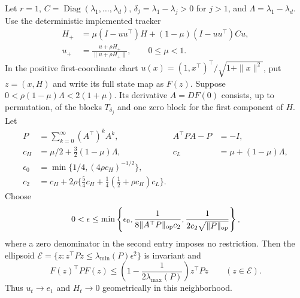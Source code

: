 \begin{theorem}
\label{thm:rankone-QR-Lyapunov}
Let $r=1$, $C=\operatorname{Diag}(\lambda_1,\ldots,\lambda_d)$,
$\delta_j=\lambda_1-\lambda_j>0$ for $j>1$, and
$\Lambda=\lambda_1-\lambda_d$. Use the deterministic implemented tracker
\begin{align}
 H_+&=\mu(I-uu^\top)H+(1-\mu)(I-uu^\top)Cu,\\
 u_+&=\frac{u+\rho H_+}{\|u+\rho H_+\|},\qquad0\le\mu<1.
 \label{eq:rankone-actual-map}
\end{align}
In the positive first-coordinate chart
$u(x)=(1,x^\top)^\top/\sqrt{1+\|x\|^2}$, put $z=(x,H)$ and write its
full state map as $F(z)$. Suppose
$0<\rho(1-\mu)\Lambda<2(1+\mu)$.
Its derivative $A=DF(0)$ consists, up to permutation, of the blocks
$T_{\delta_j}$ and one zero block for the first component of $H$.
Let
\begin{align}
 P&=\sum_{k=0}^{\infty}(A^\top)^kA^k,&A^\top PA-P&=-I,\\
 c_H&=\mu/2+\tfrac32(1-\mu)\Lambda,&
 c_L&=\mu+(1-\mu)\Lambda,\\
 \epsilon_0&=\min\{1/4,(4\rho c_H)^{-1/2}\},\\
 c_2&=c_H+2\rho\{\tfrac54c_H+
                   \tfrac14(\tfrac12+\rho c_H)c_L\}.
\end{align}
Choose
\begin{equation}
 0<\epsilon\le\min\left\{\epsilon_0,
 \frac1{8\|A^\top P\|_{\rm op}c_2},
 \frac1{2c_2\sqrt{\|P\|_{\rm op}}}\right\},
 \label{eq:explicit-rankone-radius}
\end{equation}
where a zero denominator in the second entry imposes no restriction.
Then the ellipsoid
$\mathcal E=\{z:z^\top Pz\le\lambda_{\min}(P)\epsilon^2\}$
is invariant and
\begin{equation}
 F(z)^\top PF(z)\le
 \left(1-\frac1{2\lambda_{\max}(P)}\right)z^\top Pz
                      \qquad(z\in\mathcal E).
 \label{eq:rankone-local-contraction}
\end{equation}
Thus $u_t\to e_1$ and $H_t\to0$ geometrically in this neighborhood.
\end{theorem}
